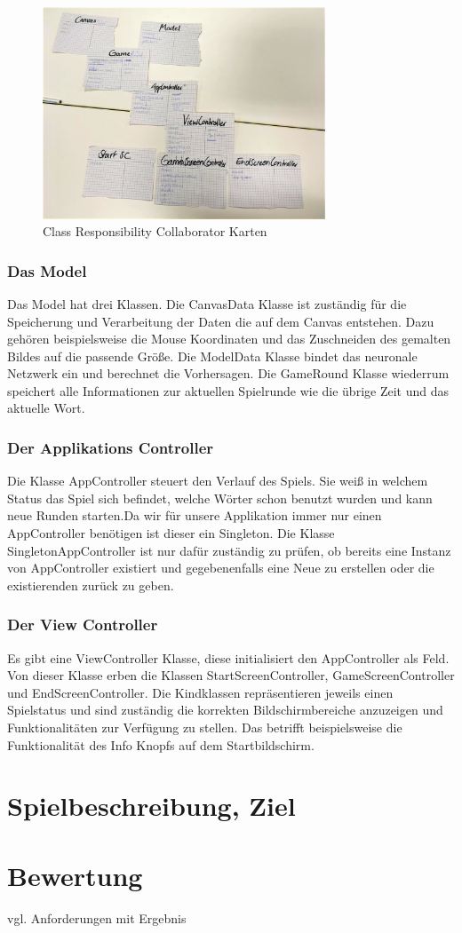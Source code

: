 \documentclass[11pt]{article}
\begin{document}
\begin{figure}[ht]
\centering
\includegraphics[width=0.75\textwidth]{images/crc.png}
\caption{\label{fig:crcCard}Class Responsibility Collaborator Karten}
\end{figure}

\subsubsection{Das Model}
Das Model hat drei Klassen. Die CanvasData Klasse ist zuständig für die Speicherung und Verarbeitung der Daten die auf dem Canvas entstehen. Dazu gehören beispielsweise die Mouse Koordinaten und das Zuschneiden des gemalten Bildes auf die passende Größe. Die ModelData Klasse bindet das neuronale Netzwerk ein und berechnet die Vorhersagen. Die GameRound Klasse wiederrum speichert alle Informationen zur aktuellen Spielrunde wie die übrige Zeit und das aktuelle Wort.

\subsubsection{Der Applikations Controller}
Die Klasse AppController steuert den Verlauf des Spiels. Sie weiß in welchem Status das Spiel sich befindet, welche Wörter schon benutzt wurden und kann neue Runden starten.Da wir für unsere Applikation immer nur einen AppController benötigen ist dieser ein Singleton. Die Klasse SingletonAppController ist nur dafür zuständig zu prüfen, ob bereits eine Instanz von AppController existiert und gegebenenfalls eine Neue zu erstellen oder die existierenden zurück zu geben.

\subsubsection{Der View Controller}
Es gibt eine ViewController Klasse, diese initialisiert den AppController als Feld. Von dieser Klasse erben die Klassen StartScreenController, GameScreenController und EndScreenController. Die Kindklassen repräsentieren jeweils einen Spielstatus und sind zuständig die korrekten Bildschirmbereiche anzuzeigen und Funktionalitäten zur Verfügung zu stellen. Das betrifft beispielsweise die Funktionalität des Info Knopfs auf dem Startbildschirm.

\section{Spielbeschreibung, Ziel}
\section{Bewertung}
vgl. Anforderungen mit Ergebnis

\pagebreak
\printbibliography
\end{document}
